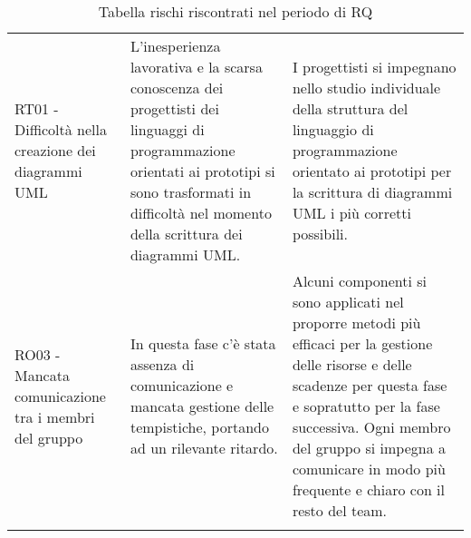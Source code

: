 \documentclass[../piano_di_progetto.tex]{subfiles}
\begin{document}
\begin{center}
\begin{longtable}{|p{4cm}|p{6cm}|p{6cm}|}
		RT01 - Difficoltà nella creazione dei diagrammi UML
		& L'inesperienza lavorativa e la scarsa conoscenza dei progettisti dei linguaggi di programmazione orientati ai prototipi si sono trasformati in difficoltà nel momento della scrittura dei diagrammi UML. 
		& I progettisti si impegnano nello studio individuale della struttura del linguaggio di programmazione orientato ai prototipi per la scrittura di diagrammi UML i più corretti possibili. \\

		RO03 - Mancata comunicazione tra i membri del gruppo
		& In questa fase c'è stata assenza di comunicazione e mancata gestione delle tempistiche, portando ad un rilevante ritardo.
		& Alcuni componenti si sono applicati nel proporre metodi più efficaci per la gestione delle risorse e delle scadenze per questa fase e sopratutto per la fase successiva. Ogni membro del gruppo si impegna a comunicare in modo più frequente e chiaro con il resto del team. \\
		\hline
		\rowcolor{white}
		\caption{Tabella rischi riscontrati nel periodo di RQ}
	\end{longtable}

\end{center}
\end{document}
